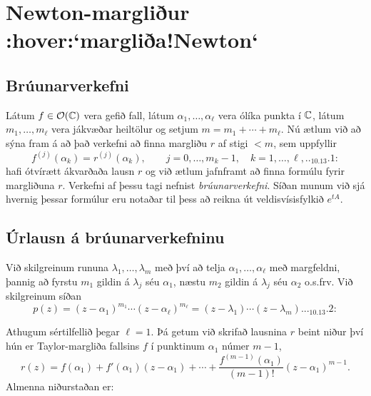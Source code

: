 \section{Newton-margliður :hover:`margliða!Newton`}


\subsection*{Brúunarverkefni}

Látum $f\in {\cal O}({\mathbb C})$ vera gefið fall, látum $\alpha_1,\dots,\alpha_\ell$
vera ólíka punkta í ${\mathbb C}$, látum $m_1,\dots,m_\ell$ vera jákvæðar
heiltölur og setjum $m=m_1+\cdots+m_\ell$.  Nú ætlum við að sýna fram
á að það verkefni að finna margliðu $r$ af
stigi $<m$, sem uppfyllir
 \begin{equation*}f^{(j)}(\alpha_k) = r^{(j)}(\alpha_k), \qquad j=0,\dots,m_k-1, \quad
k=1,\dots, \ell,

.. _10.13.1:

 \end{equation*}
hafi ótvírætt ákvarðaða lausn $r$ og við ætlum jafnframt að finna
formúlu fyrir margliðuna $r$.   Verkefni af þessu tagi nefnist
{\it brúunarverkefni}.
Síðan munum við sjá hvernig
þessar formúlur eru notaðar til þess að reikna út veldisvísisfylkið
$e^{tA}$.


\subsection*{Úrlausn á brúunarverkefninu}

Við skilgreinum rununa
$\lambda_1,\dots,\lambda_m$ með því að telja 
$\alpha_1,\dots,\alpha_\ell$ með margfeldni, þannig að fyrstu $m_1$
gildin á $\lambda_j$ séu $\alpha_1$, næstu $m_2$ gildin á $\lambda_j$
séu $\alpha_2$ o.s.frv.  Við skilgreinum síðan
 \begin{equation*}p(z)=(z-\alpha_1)^{m_1}\cdots(z-\alpha_\ell)^{m_\ell}
=(z-\lambda_1)\cdots(z-\lambda_m).

.. _10.13.2:

 \end{equation*}

Athugum sértilfellið þegar $\ell=1$.  Þá getum við skrifað lausnina
$r$  beint niður því hún er Taylor-margliða
fallsins $f$ í punktinum $\alpha_1$ númer $m-1$,
$$
r(z)=f(\alpha_1)+f'(\alpha_1)(z-\alpha_1)+\cdots +
\frac {f^{(m-1)}(\alpha_1)}{(m-1)!}(z-\alpha_1)^{m-1}.
$$
Almenna niðurstaðan er:

